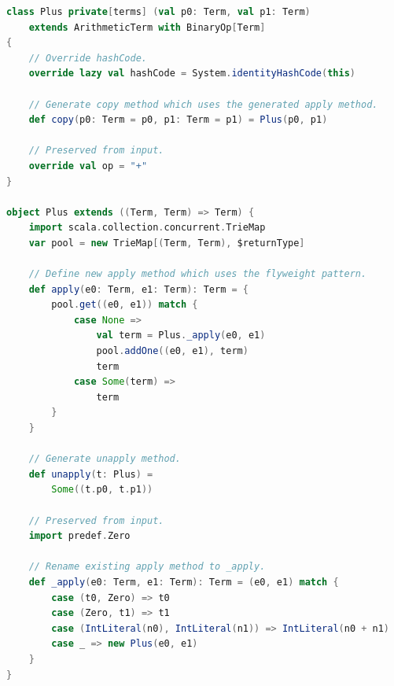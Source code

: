 \documentclass[11pt]{article}
\begin{document}
    \begin{lstlisting}[language=Scala, caption={Output code generated by our macro.}, label={lst:macro-output}]
class Plus private[terms] (val p0: Term, val p1: Term)
    extends ArithmeticTerm with BinaryOp[Term]
{
    // Override hashCode.
    override lazy val hashCode = System.identityHashCode(this)

    // Generate copy method which uses the generated apply method.
    def copy(p0: Term = p0, p1: Term = p1) = Plus(p0, p1)

    // Preserved from input.
    override val op = "+"
}

object Plus extends ((Term, Term) => Term) {
    import scala.collection.concurrent.TrieMap
    var pool = new TrieMap[(Term, Term), $returnType]

    // Define new apply method which uses the flyweight pattern.
    def apply(e0: Term, e1: Term): Term = {
        pool.get((e0, e1)) match {
            case None => 
                val term = Plus._apply(e0, e1)
                pool.addOne((e0, e1), term)
                term
            case Some(term) => 
                term
        }
    }

    // Generate unapply method.
    def unapply(t: Plus) =
        Some((t.p0, t.p1))

    // Preserved from input.
    import predef.Zero

    // Rename existing apply method to _apply.
    def _apply(e0: Term, e1: Term): Term = (e0, e1) match {
        case (t0, Zero) => t0
        case (Zero, t1) => t1
        case (IntLiteral(n0), IntLiteral(n1)) => IntLiteral(n0 + n1)
        case _ => new Plus(e0, e1)
    }
}       
    \end{lstlisting}




\end{document}
